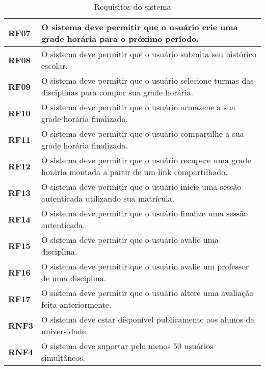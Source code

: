 \begin{table}[!ht]
    \begin{center}
        \begin{tabular}{ | m{} | p{} | }  
            \hline
            \textbf{RF07} & O sistema deve permitir que o usuário crie uma grade horária para o próximo período.\tabularnewline\hline
            \textbf{RF08} & O sistema deve permitir que o usuário submita seu histórico escolar.\tabularnewline\hline
            \textbf{RF09} & O sistema deve permitir que o usuário selecione turmas das disciplinas para compor sua grade horária.\tabularnewline\hline
            \textbf{RF10} & O sistema deve permitir que o usuário armazene a sua grade horária finalizada.\tabularnewline\hline
            \textbf{RF11} & O sistema deve permitir que o usuário compartilhe a sua grade horária finalizada. \tabularnewline\hline
            \textbf{RF12} & O sistema deve permitir que o usuário recupere uma grade horária montada a partir de um link compartilhado.\tabularnewline\hline
            
            \textbf{RF13} & O sistema deve permitir que o usuário inicie uma sessão autenticada utilizando sua matrícula.\tabularnewline\hline
            \textbf{RF14} & O sistema deve permitir que o usuário finalize uma sessão autenticada.\tabularnewline\hline
            \textbf{RF15} & O sistema deve permitir que o usuário avalie uma disciplina.\tabularnewline\hline
            \textbf{RF16} & O sistema deve permitir que o usuário avalie um professor de uma disciplina.\tabularnewline\hline
            \textbf{RF17} & O sistema deve permitir que o usuário altere uma avaliação feita anteriormente.\tabularnewline\hline

            \textbf{RNF3} & O sistema deve estar disponível publicamente aos alunos da universidade.\tabularnewline\hline
            \textbf{RNF4} & O sistema deve suportar pelo menos 50 usuários simultâneos.\tabularnewline\hline
        
        \end{tabular}
    \end{center}
    \caption{Requisitos do sistema}
    
    \label{tab:req-sistema}
\end{table}
